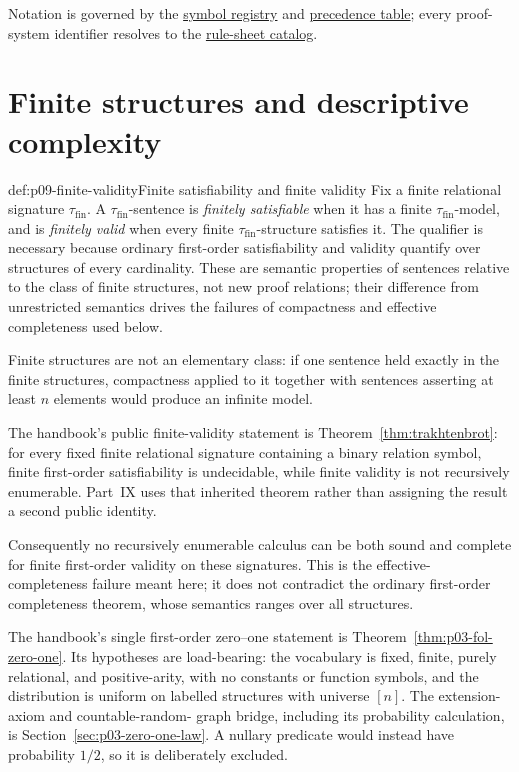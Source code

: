 Notation is governed by the
\hyperref[sec:p01-symbol-registry]{symbol registry} and
\hyperref[tab:p01-precedence]{precedence table}; every proof-system identifier
resolves to the \hyperref[sec:p14-rule-sheets]{rule-sheet catalog}.

\section{Finite structures and descriptive complexity}
\label{sec:p09-finite-structures}

\begin{hbdefinition}{def:p09-finite-validity}{Finite satisfiability and finite validity}
Fix a finite relational signature \(\tau_{\mathrm{fin}}\). A
\(\tau_{\mathrm{fin}}\)-sentence is
\emph{finitely satisfiable} when it has a finite
\(\tau_{\mathrm{fin}}\)-model, and is \emph{finitely valid} when every finite
\(\tau_{\mathrm{fin}}\)-structure satisfies it.
The qualifier is necessary because ordinary first-order satisfiability and
validity quantify over structures of every cardinality. These are semantic
properties of sentences relative to the class of finite structures, not new
proof relations; their difference from unrestricted semantics drives the
failures of compactness and effective completeness used below.
\end{hbdefinition}

Finite structures are not an elementary class: if one sentence held exactly
in the finite structures, compactness applied to it together with sentences
asserting at least \(n\) elements would produce an infinite model.

The handbook's public finite-validity statement is
Theorem~\ref{thm:trakhtenbrot}: for every fixed finite relational signature
containing a binary relation symbol, finite first-order satisfiability is
undecidable, while finite validity is not recursively enumerable.  Part~IX
uses that inherited theorem rather than assigning the result a second public
identity.

Consequently no recursively enumerable calculus can be both sound and complete
for finite first-order validity on these signatures.  This is the effective-
completeness failure meant here; it does not contradict the ordinary
first-order completeness theorem, whose semantics ranges over all structures.

The handbook's single first-order zero--one statement is
Theorem~\ref{thm:p03-fol-zero-one}.  Its hypotheses are load-bearing: the
vocabulary is fixed, finite, purely relational, and positive-arity, with no
constants or function symbols, and the distribution is uniform on labelled
structures with universe \([n]\).  The extension-axiom and countable-random-
graph bridge, including its probability calculation, is
Section~\ref{sec:p03-zero-one-law}.  A nullary predicate would instead have
probability \(1/2\), so it is deliberately excluded.

